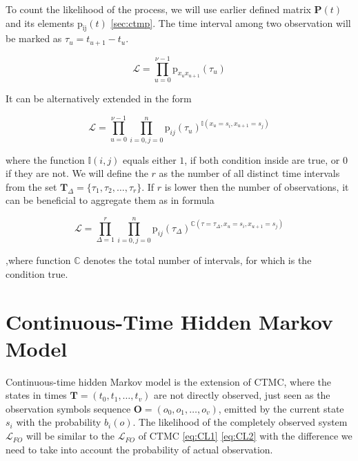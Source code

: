 \documentclass[thesis=M,english]{FITthesis}[2012/10/20]
\newcommand{\matr}[1]{\mathbf{#1}}
\begin{document}
To count the likelihood of the process, we will use earlier defined matrix $\matr{P}(t)$ and its elements $\mathrm{p_{ij}}(t)$ \ref{sec:ctmp}. The time interval among two observation will be marked as  $\tau_u = t_{u+1} - t_u$.    

\begin{equation}
 \mathcal{L} = \prod_{u=0}^{\nu-1} \mathrm{p}_{x_u x_{u+1}}(\tau_u) 
\end{equation}

It can be alternatively extended in the form

\begin{equation}
 \mathcal{L} = \prod_{u=0}^{\nu-1} \prod_{i=0,j=0}^{n}  \mathrm{p}_{ij}(\tau_u)^{\mathbb{I}( x_u = s_i, x_{u+1} = s_j )} 
\end{equation}

where the function $\mathbb{I}(i,j)$ equals either $1$, if both condition inside are true, or $0$ if they are not. 
We will define the $r$ as the number of all distinct time intervals from the set $ \matr{T}_{\Delta} = \{ \tau_1,\tau_2,\dots,\tau_r\}$. If $r$ is lower then the number of observations, it can be beneficial to aggregate them as in formula

\begin{equation}\label{eq:CTL}
 \mathcal{L} = \prod_{\Delta = 1}^{r} \prod_{i=0,j=0}^{n}  \mathrm{p}_{ij}(\tau_{\Delta})^{\mathbb{C}( \tau=\tau_{\Delta}, x_u = s_i, x_{u+1} = s_j )} 
\end{equation}

,where function $\mathbb{C}$ denotes the total number of intervals, for which is the condition true.
    

\section{Continuous-Time Hidden Markov Model}



Continuous-time hidden Markov model is the extension of CTMC, where the states in times $\matr{T} = ( t_0, t_1, \dots, t_{v} )$ are not directly observed, just seen as the observation symbols sequence $\matr{O} = (  o_0, o_1, \dots, o_{v} )$, emitted by the current state $s_i$ with the probability $b_i(o)$.
The likelihood of the completely observed system  $\mathcal{L}_{FO}$ will be similar to the $\mathcal{L}_{FO}$ of CTMC \eqref{eq:CL1} \eqref{eq:CL2} with the difference we need to take into account the probability of actual observation.
\end{document}
